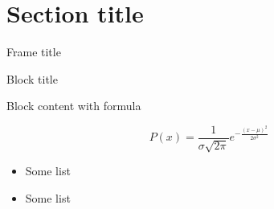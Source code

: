 \section{Section title}

	\begin{frame}{Frame title}
		
		\begin{fixblock}{Block title}
			
			Block content with formula
			
			\[
				P(x) = \frac{1}{{\sigma \sqrt{ 2 \pi } }} e^{ - \frac{(x - \mu)^2}{2 \sigma^2} }
			\]

		\end{fixblock}
		
		\begin{itemize}
			\item Some list
			\item Some list
		\end{itemize}

	\end{frame}

